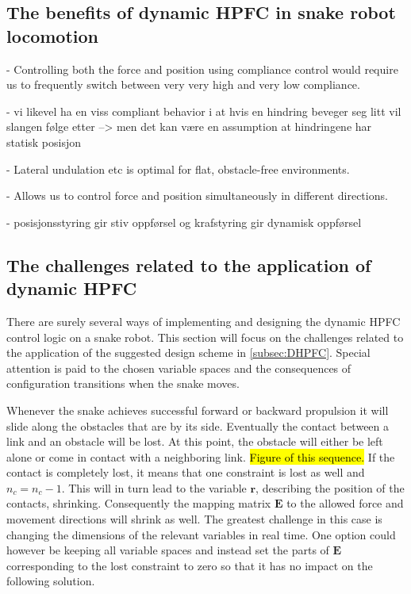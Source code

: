 \subsection{The benefits of dynamic HPFC in snake robot locomotion}

- Controlling both the force and position using compliance control would require us to frequently switch between very very high and very low compliance.

- vi likevel ha en viss compliant behavior i at hvis en hindring beveger seg litt vil slangen følge etter --> men det kan være en assumption at hindringene har statisk posisjon

- Lateral undulation etc is optimal for flat, obstacle-free environments.

- Allows us to control force and position simultaneously in different directions.

- posisjonsstyring gir stiv oppførsel og krafstyring gir dynamisk oppførsel


\subsection{The challenges related to the application of dynamic HPFC}

There are surely several ways of implementing and designing the dynamic HPFC control logic on a snake robot. This section will focus on the challenges related to the application of the suggested design scheme in \ref{subsec:DHPFC}. Special attention is paid to the chosen variable spaces and the consequences of configuration transitions when the snake moves.

Whenever the snake achieves successful forward or backward propulsion it will slide along the obstacles that are by its side. Eventually the contact between a link and an obstacle will be lost. At this point, the obstacle will either be left alone or come in contact with a neighboring link. \hl{Figure of this sequence.} If the contact is completely lost, it means that one constraint is lost as well and $n_c = n_c - 1$. This will in turn lead to the variable $\mathbf{r}$, describing the position of the contacts, shrinking. Consequently the mapping matrix $\mathbf{E}$ to the allowed force and movement directions will shrink as well. The greatest challenge in this case is changing the dimensions of the relevant variables in real time. One option could however be keeping all variable spaces and instead set the parts of $\mathbf{E}$ corresponding to the lost constraint to zero so that it has no impact on the following solution.

